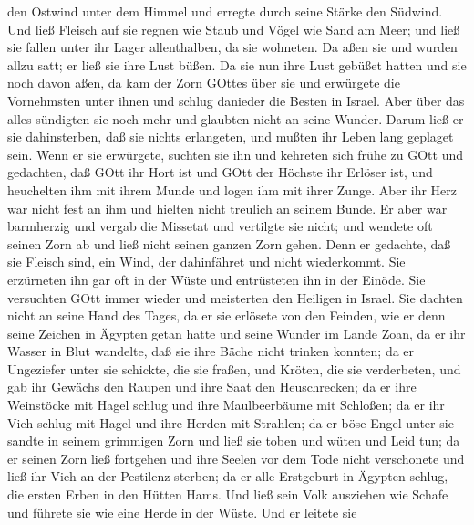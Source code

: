 den Ostwind unter dem Himmel und erregte durch seine Stärke den Südwind.
 Und ließ Fleisch auf sie regnen wie Staub und Vögel wie
Sand am Meer;  und ließ sie fallen unter ihr Lager
allenthalben, da sie wohneten.  Da aßen sie und wurden
allzu satt; er ließ sie ihre Lust büßen.  Da sie nun ihre
Lust gebüßet hatten und sie noch davon aßen,  da kam der
Zorn GOttes über sie und erwürgete die Vornehmsten unter ihnen und
schlug danieder die Besten in Israel.  Aber über das alles
sündigten sie noch mehr und glaubten nicht an seine Wunder.
 Darum ließ er sie dahinsterben, daß sie nichts erlangeten,
und mußten ihr Leben lang geplaget sein.  Wenn er sie
erwürgete, suchten sie ihn und kehreten sich frühe zu GOtt 
und gedachten, daß GOtt ihr Hort ist und GOtt der Höchste ihr Erlöser
ist,  und heuchelten ihm mit ihrem Munde und logen ihm mit
ihrer Zunge.  Aber ihr Herz war nicht fest an ihm und
hielten nicht treulich an seinem Bunde.  Er aber war
barmherzig und vergab die Missetat und vertilgte sie nicht; und wendete
oft seinen Zorn ab und ließ nicht seinen ganzen Zorn gehen.
 Denn er gedachte, daß sie Fleisch sind, ein Wind, der
dahinfähret und nicht wiederkommt.  Sie erzürneten ihn gar
oft in der Wüste und entrüsteten ihn in der Einöde.  Sie
versuchten GOtt immer wieder und meisterten den Heiligen in Israel.
 Sie dachten nicht an seine Hand des Tages, da er sie
erlösete von den Feinden,  wie er denn seine Zeichen in
Ägypten getan hatte und seine Wunder im Lande Zoan,  da er
ihr Wasser in Blut wandelte, daß sie ihre Bäche nicht trinken konnten;
 da er Ungeziefer unter sie schickte, die sie fraßen, und
Kröten, die sie verderbeten,  und gab ihr Gewächs den
Raupen und ihre Saat den Heuschrecken;  da er ihre
Weinstöcke mit Hagel schlug und ihre Maulbeerbäume mit Schloßen;
 da er ihr Vieh schlug mit Hagel und ihre Herden mit
Strahlen;  da er böse Engel unter sie sandte in seinem
grimmigen Zorn und ließ sie toben und wüten und Leid tun; 
da er seinen Zorn ließ fortgehen und ihre Seelen vor dem Tode nicht
verschonete und ließ ihr Vieh an der Pestilenz sterben;  da
er alle Erstgeburt in Ägypten schlug, die ersten Erben in den Hütten
Hams.  Und ließ sein Volk ausziehen wie Schafe und führete
sie wie eine Herde in der Wüste.  Und er leitete sie
